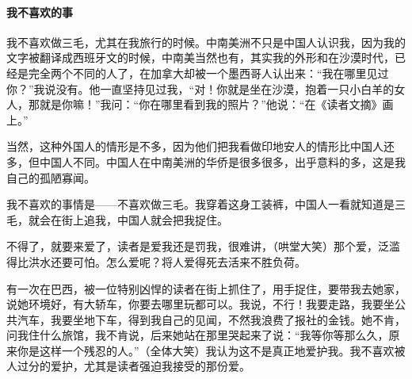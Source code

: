 \paragraph*{我不喜欢的事}
\par 我不喜欢做三毛，尤其在我旅行的时候。中南美洲不只是中国人认识我，因为我的文字被翻译成西班牙文的时候，中南美当然也有，其实我的外形和在沙漠时代，已经是完全两个不同的人了，在加拿大却被一个墨西哥人认出来：“我在哪里见过你？”我说没有。他一直坚持见过我，“对！你就是坐在沙漠，抱着一只小白羊的女人，那就是你嘛！”我问：“你在哪里看到我的照片？”他说：“在《读者文摘》画上。”
\par 当然，这种外国人的情形是不多，因为他们把我看做印地安人的情形比中国人还多，但中国人不同。中国人在中南美洲的华侨是很多很多，出乎意料的多，这是我自己的孤陋寡闻。
\par 我不喜欢的事情是——不喜欢做三毛。我穿着这身工装裤，中国人一看就知道是三毛，就会在街上追我，中国人就会把我捉住。
\par 不得了，就要来爱了，读者是爱我还是罚我，很难讲，（哄堂大笑）那个爱，泛滥得比洪水还要可怕。怎么爱呢？将人爱得死去活来不胜负荷。
\par 有一次在巴西，被一位特别凶悍的读者在街上抓住了，用手捉住，要带我去她家，说她环境好，有大轿车，你要去哪里玩都可以。我说，不行！我要走路，我要坐公共汽车，我要坐地下车，得到我自己的见闻，不然我浪费了报社的金钱。她不肯，问我住什么旅馆，我不肯说，后来她站在那里哭起来了说：“我等你等那么久，原来你是这样一个残忍的人。”（全体大笑）我认为这不是真正地爱护我。我不喜欢被人过分的爱护，尤其是读者强迫我接受的那份爱。
